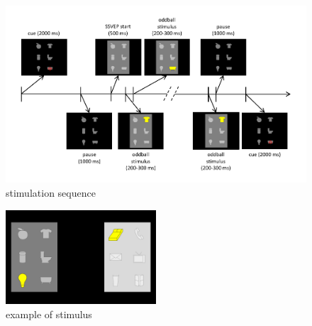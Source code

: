

\clearpage

%
\begin{figure}[t]
\centering
\includegraphics{pix/stimulationSequence2}
\caption{stimulation sequence}
\label{fig:stimSeq}
\end{figure}

%
\begin{figure}[t]
\centering
\includegraphics[width=0.5\textwidth]{pix/img0000380}
\caption{example of stimulus}
\label{fig:stim2oddball}
\end{figure}
